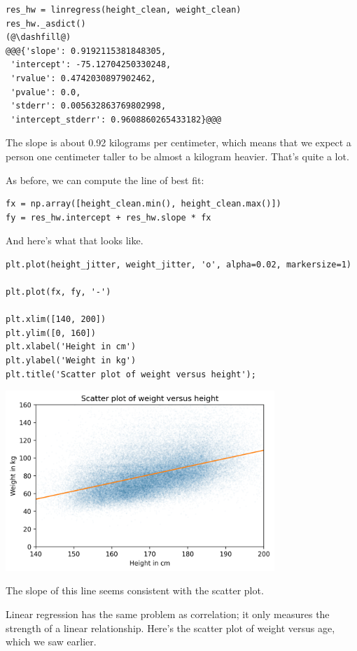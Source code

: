 \begin{lstlisting}[]
res_hw = linregress(height_clean, weight_clean)
res_hw._asdict()
(@\dashfill@)
@@@{'slope': 0.9192115381848305,
 'intercept': -75.12704250330248,
 'rvalue': 0.4742030897902462,
 'pvalue': 0.0,
 'stderr': 0.005632863769802998,
 'intercept_stderr': 0.9608860265433182}@@@
\end{lstlisting}

The slope is about 0.92 kilograms per centimeter, which means that we
expect a person one centimeter taller to be almost a kilogram heavier.
That's quite a lot.

As before, we can compute the line of best fit:

\begin{lstlisting}[]
fx = np.array([height_clean.min(), height_clean.max()])
fy = res_hw.intercept + res_hw.slope * fx
\end{lstlisting}

And here's what that looks like.

\begin{lstlisting}[]
plt.plot(height_jitter, weight_jitter, 'o', alpha=0.02, markersize=1)

plt.plot(fx, fy, '-')

plt.xlim([140, 200])
plt.ylim([0, 160])
plt.xlabel('Height in cm')
plt.ylabel('Weight in kg')
plt.title('Scatter plot of weight versus height');
\end{lstlisting}

\begin{center}
\includegraphics[width=4in]{chapters/09_relationships_files/09_relationships_100_0.png}
\end{center}

The slope of this line seems consistent with the scatter plot.

Linear regression has the same problem as correlation; it only measures
the strength of a linear relationship. Here's the scatter plot of weight
versus age, which we saw earlier.

